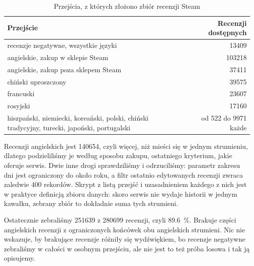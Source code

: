 \begin{table}[hbp]
  \caption{Przejścia, z których złożono zbiór recenzji Steam}
  \label{tab:steam-passes}
  \centering
  \small
  \begin{tabular}{|p{}|r|}
    \hline
    Przejście                                                                              & Recenzji dostępnych \\
    \hline
    recenzje negatywne, wszystkie języki                                                   & \num{13409}         \\
    \hline
    angielskie, zakup w sklepie Steam                                                      & \num{103218}        \\
    \hline
    angielskie, zakup poza sklepem Steam                                                   & \num{37411}         \\
    \hline
    chiński uproszczony                                                                    & \num{39575}         \\
    \hline
    francuski                                                                              & \num{23607}         \\
    \hline
    rosyjski                                                                               & \num{17160}         \\
    \hline
    hiszpański, niemiecki, koreański, polski, chiński tradycyjny, turecki, japoński, portugalski & od \num{522} do \num{9971} każde \\
    \hline
  \end{tabular}
\end{table}

Recenzji angielskich jest \num{140654}, czyli więcej, niż mieści się w jednym strumieniu, dlatego podzieliliśmy je według sposobu zakupu, ostatniego kryterium, jakie oferuje serwis.
Dwie inne drogi sprawdziliśmy i odrzuciliśmy: parametr zakresu dni jest ograniczony do około roku, a filtr ostatnio edytowanych recenzji zwraca zaledwie 400 rekordów.
Skrypt  z listą przejść i uzasadnieniem każdego z nich jest w praktyce definicją zbioru danych: skoro serwis nie wydaje historii w jednym kawałku, zebrany zbiór to dokładnie suma tych strumieni.

Ostatecznie zebraliśmy \num{251639} z \num{280699} recenzji, czyli \qty{89.6}{\percent}.
Brakuje części angielskich recenzji z ograniczonych końcówek obu angielskich strumieni.
Nic nie wskazuje, by brakujące recenzje różniły się wydźwiękiem, bo recenzje negatywne zebraliśmy w całości w osobnym przejściu, ale nie jest to też próba losowa i tak ją opisujemy.


